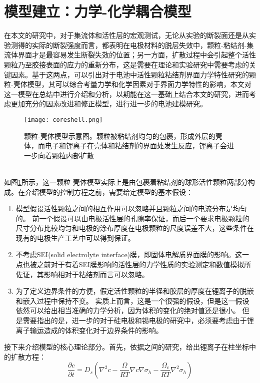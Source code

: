 \section{模型建立：力学-化学耦合模型}
在本文的研究中，对于集流体和活性层的宏观测试，无论从实验的断裂面还是从实验测得的实际的断裂强度而言，都表明在电极材料的脱层失效中，颗粒-粘结剂-集流体界面才是最容易发生断裂失效的位置；另一方面，扩散过程中会引起整个活性颗粒乃至胶接表面的应力的重新分布，这是需要在理论和实验研究中需要考虑的关键因素。基于这两点，可以引出对于电池中活性颗粒粘结剂界面力学特性研究的颗粒-壳体模型，其可以综合考量力学和化学因素对于界面力学特性的影响，本文对这一模型在总结中进行介绍和分析，以期能在这一基础上结合本文的研究，进而考虑更加充分的因素改进和修正模型，进行进一步的电池建模研究。
\begin{figure}
\centering   
\texttt{[image: coreshell.png]}
\caption{颗粒-壳体模型示意图。颗粒被粘结剂均匀的包裹，形成外层的壳体，而电子和锂离子在壳体和粘结剂的界面处发生反应，锂离子会进一步向着颗粒内部扩散} 
\label{fig:cs}
\end{figure}
\\
\indent 如图\ref{fig:cs}所示，这一颗粒-壳体模型实际上是由包裹着粘结剂的球形活性颗粒两部分构成。在介绍模型的控制方程之前，需要给定模型的基本假设\cite{Takahashi2016Mechanical}：
\begin{enumerate}
	\item 模型假设活性颗粒之间的相互作用可以忽略并且颗粒之间的电流分布是均匀的。 前一个假设可以由电极活性层的孔隙率保证，而后一个要求电极颗粒的尺寸分布比较均匀和电极的涂布厚度在电极颗粒的尺度误差不大，这些条件在现有的电极生产工艺中可以得到保证\cite{Takahashi2015Examination}。
	\item 不考虑SEI(solid electrolyte interface)膜，即固体电解质界面膜的影响。这一点也被之前对于有着SEI膜影响的活性层的力学性质的实验测定\cite{Zhang2012Direct}和数值模拟\cite{Zheng20143D}所佐证，其影响相对于粘结剂而言可以忽略。
	\item 为了定义边界条件的方便，假定活性颗粒的半径和胶层的厚度在锂离子的脱嵌和嵌入过程中保持不变。 实质上而言，这是一个很强的假设，但是这一假设依然可以给出相当准确的力学分析，因为体积的变化的绝对值还是很小。 但是需要指出的是，进一步的对于硅电极和锡电极的研究中，必须要考虑由于锂离子输运造成的体积变化对于边界条件的影响。
\end{enumerate}
接下来介绍模型的核心理论部分。首先，依据之间的研究\cite{Zhang2007Numerical}，给出锂离子在柱坐标中的扩散方程：
\begin{equation}
\label{eq:ch}
\frac{\partial c}{\partial t} = D_s \left( \nabla^2 c -\frac{\Omega}{RT}\nabla c \nabla \sigma_h -\frac{\Omega_c}{RT}\nabla^2 \sigma_h \right)
\end{equation}
